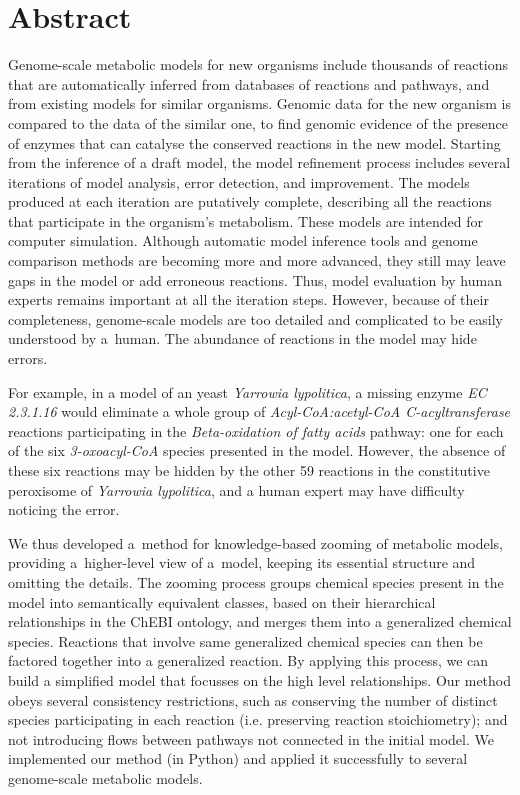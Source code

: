 \documentclass[10pt]{bmc_article}
\newenvironment{bmcformat}{\baselineskip20pt\sloppy\setboolean{publ}{false}}{\baselineskip20pt\sloppy}
\begin{document}
\begin{bmcformat}
\section*{Abstract}
Genome-scale metabolic models for new organisms include thousands of reactions that are automatically inferred from databases of reactions and pathways, and from existing models for similar organisms. Genomic data for the new organism is compared to the data of the similar one, to find genomic evidence of the presence of enzymes that can catalyse the conserved reactions in the new model. Starting from the inference of a draft model, the model refinement process includes several iterations of model analysis, error detection, and improvement. The models produced at each iteration are putatively complete, describing all the reactions that participate in the organism's metabolism. These models are intended for computer simulation. Although automatic model inference tools and genome comparison methods are becoming more and more advanced, they still may leave gaps in the model or add erroneous reactions. Thus, model evaluation by human experts remains important at all the iteration steps. However, because of their completeness, genome-scale models are too detailed and complicated to be easily understood by a~human. The abundance of reactions in the model may hide errors.


For example, in a model of an yeast \textit{Yarrowia lypolitica}, a missing enzyme \textit{EC 2.3.1.16} would eliminate a whole group of \textit{Acyl-CoA:acetyl-CoA C-acyltransferase} reactions participating in the \textit{Beta-oxidation of fatty acids} pathway: one for each of the six \textit{3-oxoacyl-CoA} species presented in the model. However, the absence of these six reactions may be hidden by the other 59 reactions in the constitutive peroxisome of \textit{Yarrowia lypolitica}, and a human expert may have difficulty noticing the error.


We thus developed a~method for knowledge-based zooming of metabolic models, providing a~higher-level view of a~model, keeping its essential structure and omitting the details. The zooming process groups chemical species present in the model into semantically equivalent classes, based on their hierarchical relationships in the ChEBI ontology, and merges them into a generalized chemical species. Reactions that involve same generalized chemical species can then be factored together into a generalized reaction. By applying this process, we can build a simplified model that focusses on the high level relationships. Our method obeys several consistency restrictions, such as conserving the number of distinct species participating in each reaction (i.e. preserving reaction stoichiometry); and not introducing flows between pathways not connected in the initial model. We implemented our method (in Python) and applied it successfully to several genome-scale metabolic models.


\end{bmcformat}
\end{document}
